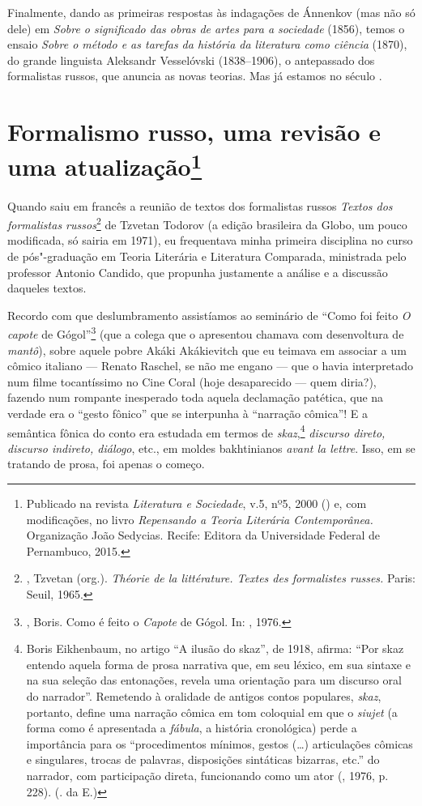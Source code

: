 {{{Finalmente, dando as primeiras respostas às indagações de Ánnenkov (mas
não só dele) em \emph{Sobre o significado das obras de artes para a sociedade}
(1856), temos o ensaio \emph{Sobre o método e as tarefas da história da
literatura como ciência} (1870), do grande linguista Aleksandr
Vesselóvski (1838--1906), o antepassado dos formalistas russos, que anuncia as novas
teorias. Mas já estamos no século .

\chapter{Formalismo russo, uma revisão e uma atualização\footnote{Publicado na revista \emph{Literatura e Sociedade}, v.5, nº5, 2000 () e, com modificações, no livro \emph{Repensando a Teoria Literária Contemporânea.} Organização João Sedycias. Recife: Editora da Universidade Federal de Pernambuco, 2015.}}

Quando saiu em francês a reunião de textos dos formalistas russos \emph{Textos dos formalistas
russos}\footnote{, 
Tzvetan (org.). \emph{Théorie de la littérature. Textes des 
formalistes russes.} Paris: Seuil, 1965.} de Tzvetan Todorov
(a edição brasileira da Globo, um pouco modificada, só sairia em 1971),
eu frequentava minha primeira disciplina no curso de pós"-graduação em Teoria Literária
e Literatura Comparada, ministrada pelo professor Antonio Candido, que propunha
justamente a análise e a discussão daqueles textos.


 Recordo com que deslumbramento assistíamos ao seminário de
``Como foi feito \emph{O capote} de Gógol''\footnote{, Boris.
 Como é feito o \emph{Capote} de Gógol. In: , 1976.} (que a colega que o
apresentou chamava com desenvoltura de \emph{mantô}), sobre aquele pobre Akáki
Akákievitch que eu teimava em associar a um cômico italiano --- Renato
Raschel, se não me engano --- que o havia interpretado num filme
tocantíssimo no Cine Coral (hoje desaparecido --- quem diria?), fazendo num rompante inesperado toda aquela declamação patética, que na
verdade era o ``gesto fônico'' que se interpunha à ``narração cômica''!
E a semântica fônica do conto era estudada em termos de \emph{skaz},\footnote{Boris Eikhenbaum, no artigo “A ilusão do skaz”,
 de 1918, afirma: ``Por skaz entendo aquela forma de prosa narrativa
 que, em seu léxico, em sua sintaxe e na sua seleção das entonações,
 revela uma orientação para um discurso oral do narrador''. Remetendo
 à oralidade de antigos contos populares, \emph{skaz}, portanto, 
define uma narração cômica em tom coloquial em que o \emph{siujet}
 (a forma como é apresentada a \emph{fábula}, a história cronológica)
 perde a importância para os ``procedimentos mínimos, gestos
 (\ldots{}) articulações cômicas e singulares, trocas de palavras,
 disposições sintáticas bizarras, etc.'' do narrador, com participação 
direta, funcionando como um ator (, 1976, p. 228).
 (. da {E}.)}
\emph{discurso direto, discurso indireto, diálogo}, etc., em moldes bakhtinianos
\emph{avant la lettre}. Isso, em se tratando de prosa, foi apenas o começo.


}}}
